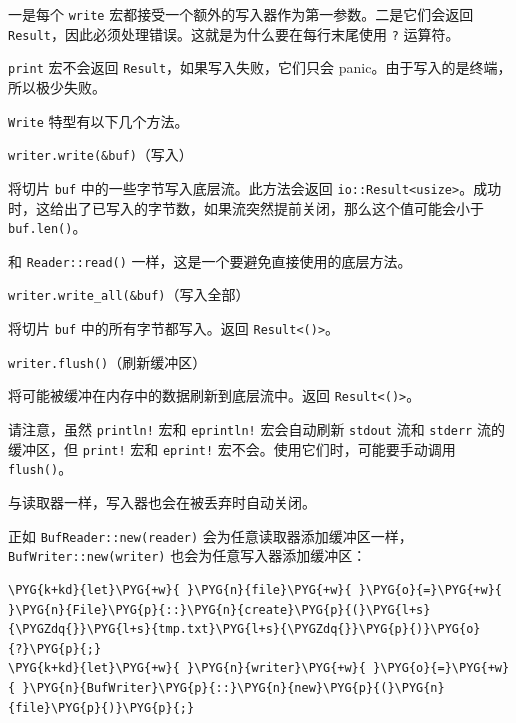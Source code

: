 一是每个 \texttt{write} 宏都接受一个额外的写入器作为第一参数。二是它们会返回 \texttt{Result}，因此必须处理错误。这就是为什么要在每行末尾使用 \texttt{?} 运算符。

\texttt{print} 宏不会返回 \texttt{Result}，如果写入失败，它们只会 panic。由于写入的是终端，所以极少失败。

\texttt{Write} 特型有以下几个方法。

\begin{mySidenote}
\texttt{writer.write(\&buf)}（写入）
\end{mySidenote}

将切片 \texttt{buf} 中的一些字节写入底层流。此方法会返回 \texttt{io::Result<usize>}。成功时，这给出了已写入的字节数，如果流突然提前关闭，那么这个值可能会小于 \texttt{buf.len()}。

和 \texttt{Reader::read()} 一样，这是一个要避免直接使用的底层方法。

\begin{myNote}
\texttt{writer.write\_all(\&buf)}（写入全部）
\end{myNote}

将切片 \texttt{buf} 中的所有字节都写入。返回 \texttt{Result<()>}。

\begin{mySidenote}
\texttt{writer.flush()}（刷新缓冲区）
\end{mySidenote}

将可能被缓冲在内存中的数据刷新到底层流中。返回 \texttt{Result<()>}。

请注意，虽然 \texttt{println!} 宏和 \texttt{eprintln!} 宏会自动刷新 \texttt{stdout} 流和 \texttt{stderr} 流的缓冲区，但 \texttt{print!} 宏和 \texttt{eprint!} 宏不会。使用它们时，可能要手动调用 \texttt{flush()}。

与读取器一样，写入器也会在被丢弃时自动关闭。

正如 \texttt{BufReader::new(reader)} 会为任意读取器添加缓冲区一样，\texttt{BufWriter::new(writer)} 也会为任意写入器添加缓冲区：

\begin{Verbatim}[commandchars=\\\{\},breaklines=true,breakanywhere=true,fontsize=\codefont,xleftmargin=17bp]
\PYG{k+kd}{let}\PYG{+w}{ }\PYG{n}{file}\PYG{+w}{ }\PYG{o}{=}\PYG{+w}{ }\PYG{n}{File}\PYG{p}{::}\PYG{n}{create}\PYG{p}{(}\PYG{l+s}{\PYGZdq{}}\PYG{l+s}{tmp.txt}\PYG{l+s}{\PYGZdq{}}\PYG{p}{)}\PYG{o}{?}\PYG{p}{;}
\PYG{k+kd}{let}\PYG{+w}{ }\PYG{n}{writer}\PYG{+w}{ }\PYG{o}{=}\PYG{+w}{ }\PYG{n}{BufWriter}\PYG{p}{::}\PYG{n}{new}\PYG{p}{(}\PYG{n}{file}\PYG{p}{)}\PYG{p}{;}
\end{Verbatim}

